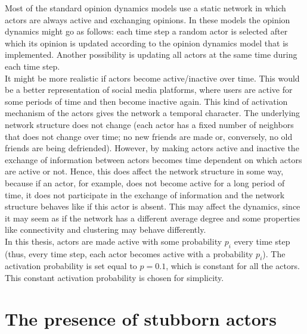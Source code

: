 \documentclass[11 pt , letterpaper , twoside , openright]{book}
\begin{document}
Most of the standard opinion dynamics models use a static network in which actors are always active and exchanging opinions. In these models the opinion dynamics might go as follows: each time step a random actor is selected after which its opinion is updated according to the opinion dynamics model that is implemented. Another possibility is updating all actors at the same time during each time step. \\
\newline
It might be more realistic if actors become active/inactive over time. This would be a better representation of social media platforms, where users are active for some periods of time and then become inactive again. This kind of activation mechanism of the actors gives the network a temporal character. The underlying network structure does not change (each actor has a fixed number of neighbors that does not change over time; no new friends are made or, conversely, no old friends are being defriended). However, by making actors active and inactive the exchange of information between actors becomes time dependent on which actors are active or not. Hence, this does affect the network structure in some way, because if an actor, for example, does not become active for a long period of time, it does not participate in the exchange of information and the network structure behaves like if this actor is absent. This may affect the dynamics, since it may seem as if the network has a different average degree and some properties like connectivity and clustering may behave differently. \\
\newline
In this thesis, actors are made active with some probability $p_i$ every time step (thus, every time step, each actor becomes active with a probability $p_i$). The activation probability is set equal to $p = 0.1$, which is constant for all the actors. This constant activation probability is chosen for simplicity.

\section{The presence of stubborn actors}\label{stubb}
\end{document}
